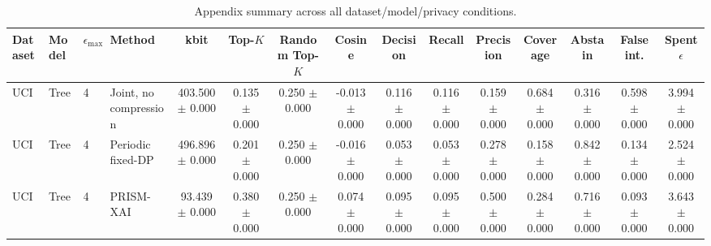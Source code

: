 \begin{table}[t]
\caption{Appendix summary across all dataset/model/privacy conditions.}
\label{tab:appendix-conditions}
\centering
\scriptsize
\setlength{\tabcolsep}{2.5pt}
\begin{tabular}{llllccccccccccc}
\toprule
Dataset & Model & $\epsilon_{\max}$ & Method & kbit & Top-$K$ & Random Top-$K$ & Cosine & Decision & Recall & Precision & Coverage & Abstain & False int. & Spent $\epsilon$ \\
\midrule
UCI & Tree & 4 & Joint, no compression & 403.500 $\pm$ 0.000 & 0.135 $\pm$ 0.000 & 0.250 $\pm$ 0.000 & -0.013 $\pm$ 0.000 & 0.116 $\pm$ 0.000 & 0.116 $\pm$ 0.000 & 0.159 $\pm$ 0.000 & 0.684 $\pm$ 0.000 & 0.316 $\pm$ 0.000 & 0.598 $\pm$ 0.000 & 3.994 $\pm$ 0.000 \\
UCI & Tree & 4 & Periodic fixed-DP & 496.896 $\pm$ 0.000 & 0.201 $\pm$ 0.000 & 0.250 $\pm$ 0.000 & -0.016 $\pm$ 0.000 & 0.053 $\pm$ 0.000 & 0.053 $\pm$ 0.000 & 0.278 $\pm$ 0.000 & 0.158 $\pm$ 0.000 & 0.842 $\pm$ 0.000 & 0.134 $\pm$ 0.000 & 2.524 $\pm$ 0.000 \\
UCI & Tree & 4 & PRISM-XAI & 93.439 $\pm$ 0.000 & 0.380 $\pm$ 0.000 & 0.250 $\pm$ 0.000 & 0.074 $\pm$ 0.000 & 0.095 $\pm$ 0.000 & 0.095 $\pm$ 0.000 & 0.500 $\pm$ 0.000 & 0.284 $\pm$ 0.000 & 0.716 $\pm$ 0.000 & 0.093 $\pm$ 0.000 & 3.643 $\pm$ 0.000 \\
\bottomrule
\end{tabular}
\end{table}
